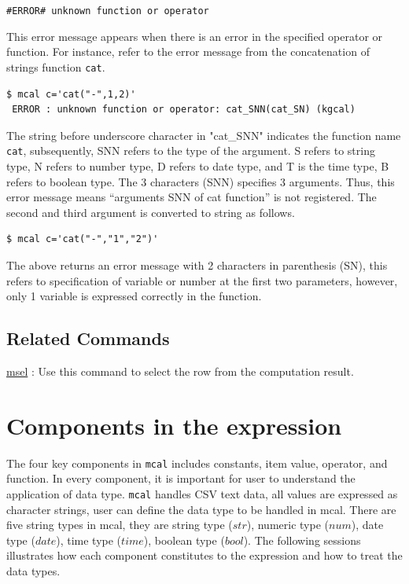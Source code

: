 \verb|#ERROR# unknown function or operator|

This error message appears when there is an error in the specified operator or function. For instance, refer to the error message from the concatenation of strings function \verb|cat|. 


\begin{Verbatim}[baselinestretch=0.7,frame=single,fontsize=\small]
 $ mcal c='cat("-",1,2)'
 ERROR : unknown function or operator: cat_SNN(cat_SN) (kgcal)
\end{Verbatim}

The string before underscore character in "cat\_SNN" indicates the function name \verb|cat|, subsequently, SNN refers to the type of the argument. S refers to string type, N refers to number type, D refers to date type, and T is the time type, B refers to boolean type. The 3 characters (SNN) specifies 3 arguments. Thus, this error message means “arguments SNN of cat function” is not registered. The second and third argument is converted to string as follows. 

\begin{Verbatim}[baselinestretch=0.7,frame=single,fontsize=\small]
 $ mcal c='cat("-","1","2")'
\end{Verbatim}

The above returns an error message with 2 characters in parenthesis (SN), this refers to specification of variable or number at the first two parameters, however, only 1 variable is expressed correctly in the function.  


\subsection*{Related Commands}
\hyperref[sect:msel]{msel} :  Use this command to select the row from the computation result.



\section{Components in the expression\label{sec:elem}}

The four key components in \verb|mcal| includes constants, item value, operator, and function. In every component, it is important for user to understand the application of data type. \verb|mcal| handles CSV text data, all values are expressed as character strings, user can define the data type to be handled in mcal. There are five string types in mcal, they are string type ($str$), numeric type ($num$), date type ($date$), time type ($time$), boolean  type ($bool$). The following sessions illustrates how each component constitutes to the expression and how to treat the data types.  



